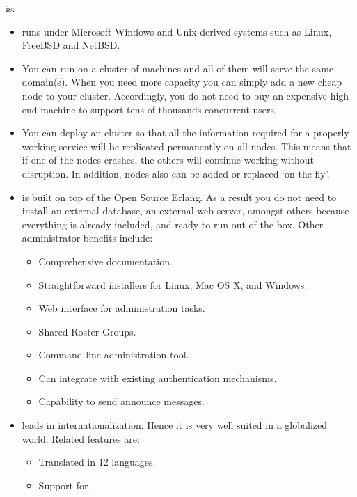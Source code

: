 \ejabberd{} is:
\begin{itemize}
\item {} \ejabberd{} runs under Microsoft Windows and Unix derived systems such as Linux, FreeBSD and NetBSD.

\item {} You can run \ejabberd{} on a cluster of machines and all of them will serve the same \Jabber{} domain(s). When you need more capacity you can simply add a new cheap node to your cluster. Accordingly, you do not need to buy an expensive high-end machine to support tens of thousands concurrent users.

\item {} You can deploy an \ejabberd{} cluster so that all the information required for a properly working service will be replicated permanently on all nodes. This means that if one of the nodes crashes, the others will continue working without disruption. In addition, nodes also can be added or replaced `on the fly'.

\item {} \ejabberd{} is built on top of the Open Source Erlang. As a result you do not need to install an external database, an external web server, amongst others because everything is already included, and ready to run out of the box. Other administrator benefits include:
\begin{itemize}
\item Comprehensive documentation.
\item Straightforward installers for Linux, Mac OS X, and Windows.\improved{}
\item Web interface for administration tasks.
\item Shared Roster Groups.
\item Command line administration tool.
\item Can integrate with existing authentication mechanisms.
\item Capability to send announce messages.
\end{itemize}

\item {} \ejabberd{} leads in internationalization. Hence it is very well suited in a globalized world. Related features are:
\begin{itemize}
\item Translated in 12 languages.
\item Support for .
\end{itemize}


\end{itemize}
